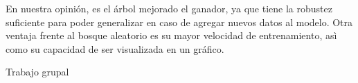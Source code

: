 \documentclass[a4paper]{article}
\begin{document}
    En nuestra opinión, es el árbol mejorado el ganador, ya que tiene la robustez suficiente para poder generalizar en caso de agregar nuevos datos al modelo. Otra ventaja frente al bosque aleatorio es su mayor velocidad de entrenamiento, asì como su capacidad de ser visualizada en un gráfico.
    
    Trabajo grupal
        
\end{document}
